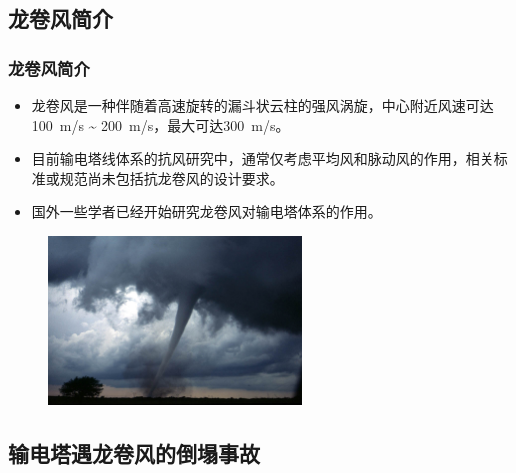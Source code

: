 \documentclass[]{beamer}
\begin{document}
\subsection{龙卷风简介}
\begin{frame}
  \frametitle{龙卷风简介}
  \begin{itemize}
  	\item<1->
  	  龙卷风是一种伴随着高速旋转的漏斗状云柱的强风涡旋，中心附近风速可达
  	  \SI{100}{m/s} \textasciitilde{} \SI{200}{m/s}，最大可达\SI{300}{m/s}。
  	\item<2->
  	  目前输电塔线体系的抗风研究中，通常仅考虑平均风和脉动风的作用，相关标准或规范尚未包括抗龙卷风的设计要求。
  	\item<3->
  	  国外一些学者已经开始研究龙卷风对输电塔体系的作用。
  \end{itemize}
  \begin{figure}
  	\includegraphics[width=0.6\textwidth]{fig/Dszpics.jpg}
  \end{figure}
\end{frame}

\subsection{输电塔遇龙卷风的倒塌事故}
\end{document}
